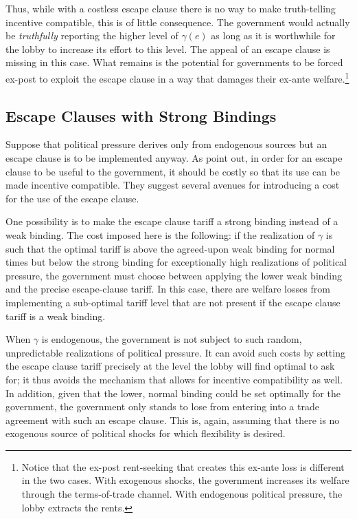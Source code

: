 \documentclass[12pt]{article}
\newcommand{\ga}{\gamma}
\begin{document}
Thus, while with a costless escape clause there is no way to make truth-telling incentive compatible, this is of little consequence. The government would actually be \textit{truthfully} reporting the higher level of $\ga(e)$ as long as it is worthwhile for the lobby to increase its effort to this level. The appeal of an escape clause is missing in this case. What remains is the potential for governments to be forced ex-post to exploit the escape clause in a way that damages their ex-ante welfare.\footnote{Notice that the ex-post rent-seeking that creates this ex-ante loss is different in the two cases. With exogenous shocks, the government increases its welfare through the terms-of-trade channel. With endogenous political pressure, the lobby extracts the rents.}

\subsection{Escape Clauses with Strong Bindings}
\label{sec:strong}
Suppose that political pressure derives only from endogenous sources but an escape clause is to be implemented anyway. As \Textcite{bs2005} point out, in order for an escape clause to be useful to the government, it should be costly so that its use can be made incentive compatible. They suggest several avenues for introducing a cost for the use of the escape clause.

One possibility is to make the escape clause tariff a strong binding instead of a weak binding. The cost imposed here is the following: if the realization of $\ga$ is such that the optimal tariff is above the agreed-upon weak binding for normal times but below the strong binding for exceptionally high realizations of political pressure, the government must choose between applying the lower weak binding and the precise escape-clause tariff. In this case, there are welfare losses from implementing a sub-optimal tariff level that are not present if the escape clause tariff is a weak binding.

When $\ga$ is endogenous, the government is not subject to such random, unpredictable realizations of political pressure. It can avoid such costs by setting the escape clause tariff precisely at the level the lobby will find optimal to ask for; it thus avoids the mechanism that allows for incentive compatibility as well. In addition, given that the lower, normal binding could be set optimally for the government, the government only stands to lose from entering into a trade agreement with such an escape clause. This is, again, assuming that there is no exogenous source of political shocks for which flexibility is desired.
\end{document}
